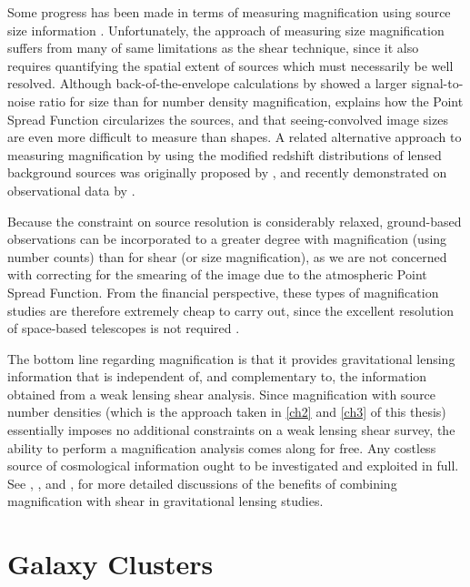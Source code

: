 Some progress has been made in terms of measuring magnification using source size information \citep{Huff14,Schmidt12}. Unfortunately, the approach of measuring size magnification suffers from many of same limitations as the shear technique, since it also requires quantifying the spatial extent of sources which must necessarily be well resolved. Although back-of-the-envelope calculations by \citet{BS01} showed a larger signal-to-noise ratio for size than for number density magnification, \citet{Schneider06_WeakGravLens} explains how the Point Spread Function circularizes the sources, and that seeing-convolved image sizes are even more difficult to measure than shapes. A related alternative approach to measuring magnification by using the modified redshift distributions of lensed background sources was originally proposed by \citet{Broadhurst95}, and recently demonstrated on observational data by \citet{Coupon13}.

Because the constraint on source resolution is considerably relaxed, ground-based observations can be incorporated to a greater degree with magnification (using number counts) than for shear (or size magnification), as we are not concerned with correcting for the smearing of the image due to the atmospheric Point Spread Function. From the financial perspective, these types of magnification studies are therefore extremely cheap to carry out, since the excellent resolution of space-based telescopes is not required \citep{Hildebrandt09b}. 

The bottom line regarding magnification is that it provides gravitational lensing information that is independent of, and complementary to, the information obtained from a weak lensing shear analysis. Since magnification with source number densities (which is the approach taken in \autoref{ch2} and \autoref{ch3} of this thesis) essentially imposes no additional constraints on a weak lensing shear survey, the ability to perform a magnification analysis comes along for free. Any costless source of cosmological information ought to be investigated and exploited in full. See \citet{Waerbeke10}, \citet{RozoSchmidt10}, and \citet{Umetsu11}, for more detailed discussions of the benefits of combining magnification with shear in gravitational lensing studies.


\section{Galaxy Clusters}
\label{sec:Clusters}

